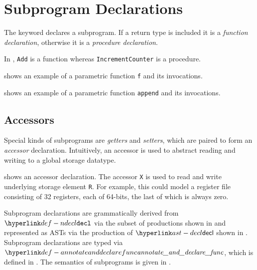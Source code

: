 \chapter{Subprogram Declarations\label{chap:SubprogramDeclarations}}

The \Tfunc{} keyword declares a subprogram. If a return type is included it is a \emph{function declaration},
otherwise it is a \emph{procedure declaration}. 

In , \verb|Add| is a function whereas \verb|IncrementCounter| is a procedure.

 shows an example of a parametric function \verb|f| and its invocations.

 shows an example of a parametric function \verb|append| and its invocations.

\section{Accessors}
Special kinds of subprograms are \emph{getters} and \emph{setters}, which are paired to form an \emph{accessor}
declaration. Intuitively, an accessor is used to abstract reading and writing to a global storage datatype.

 shows an accessor declaration.
The accessor \texttt{X} is used to read and write underlying storage element \texttt{R}.
For example, this could model a register file consisting of 32 registers, each of 64-bits, the last of which is always zero.


Subprogram declarations are grammatically derived from $\Ndecl$ via the subset of productions shown in
 and represented as ASTs via the production of $\decl$
shown in .
%
Subprogram declarations are typed via $\annotateanddeclarefunc$, which is defined in .
%
The semantics of subprograms is given in .

